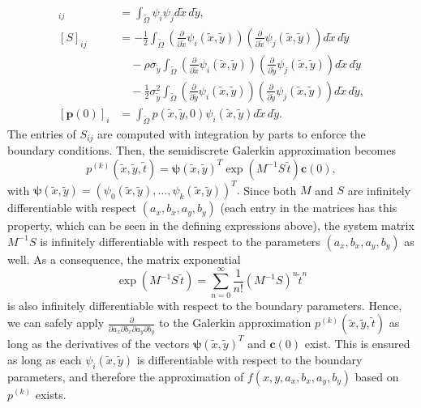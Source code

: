 \begin{align*}
  [M]_{ij} &= \displaystyle \int_{\tilde{\Omega}} \psi_i \psi_j d\tilde{x}\,d\tilde{y}, \\
  [S]_{ij} &= -\frac{1}{2} \displaystyle \int_{\tilde{\Omega}} \left( \frac{\partial}{\partial \tilde{x}} \psi_i(\tilde{x},\tilde{y}) \right) \left( \frac{\partial}{\partial \tilde{x}} \psi_j(\tilde{x},\tilde{y}) \right) d\tilde{x}\,d\tilde{y} \\
           &\quad -\rho\sigma_{\tilde{y}} \displaystyle \int_{\tilde{\Omega}} \left( \frac{\partial}{\partial \tilde{x}} \psi_i(\tilde{x},\tilde{y}) \right) \left( \frac{\partial}{\partial \tilde{y}} \psi_j(\tilde{x},\tilde{y}) \right) d\tilde{x}\,d\tilde{y} \\
           &\quad -\frac{1}{2}\sigma_{\tilde{y}}^2 \displaystyle \int_{\tilde{\Omega}} \left( \frac{\partial}{\partial \tilde{y}} \psi_i(\tilde{x},\tilde{y}) \right) \left( \frac{\partial}{\partial \tilde{y}} \psi_j(\tilde{x},\tilde{y}) \right) d\tilde{x}\,d\tilde{y}, \\
  [\mathbf{p}(0)]_i &= \displaystyle \int_{\tilde{\Omega}} p(\tilde{x},\tilde{y},0) \psi_i(\tilde{x},\tilde{y}) d\tilde{x}\,d\tilde{y}.
\end{align*}
The entries of $S_{ij}$ are computed with integration by parts to
enforce the boundary conditions. Then, the semidiscrete Galerkin approximation
becomes
\[
  p^{(k)}(\tilde{x},\tilde{y},\tilde{t}) = \boldsymbol{\psi}(\tilde{x},\tilde{y})^T \exp\left( M^{-1}S\, \tilde{t} \right) \mathbf{c}(0),
\]
with
$\boldsymbol{\psi}(\tilde{x},\tilde{y}) =
(\psi_0(\tilde{x},\tilde{y}), \ldots, \psi_k(\tilde{x},\tilde{y}))^T.$
Since both $M$ and $S$ are infinitely differentiable with respect
$(a_x, b_x, a_y, b_y)$ (each entry in the matrices has this property,
which can be seen in the defining expressions above), the system
matrix $M^{-1}S$ is infinitely differentiable with respect to the
parameters $(a_x, b_x, a_y, b_y)$ as well. As a consequence, the
matrix exponential
\[
  \exp\left( M^{-1}S\, \tilde{t} \right) = \sum_{n=0}^\infty \frac{1}{n!}
  \left(M^{-1}S\right)^n \tilde{t}^n
\]
is also infinitely differentiable with respect to the boundary
parameters. Hence, we can safely apply
$\frac{\partial}{\partial a_x \partial b_x \partial a_y \partial b_y}$
to the Galerkin approximation $p^{(k)}(\tilde{x},\tilde{y},\tilde{t})$
as long as the derivatives of the vectors
$\boldsymbol{\psi}(\tilde{x},\tilde{y})^T$ and $\mathbf{c}(0)$
exist. This is ensured as long as each $\psi_i(\tilde{x},\tilde{y})$
is differentiable with respect to the boundary parameters, and
therefore the approximation of $f(x,y,a_x,b_x,a_y,b_y)$ based on
$p^{(k)}$ exists.

